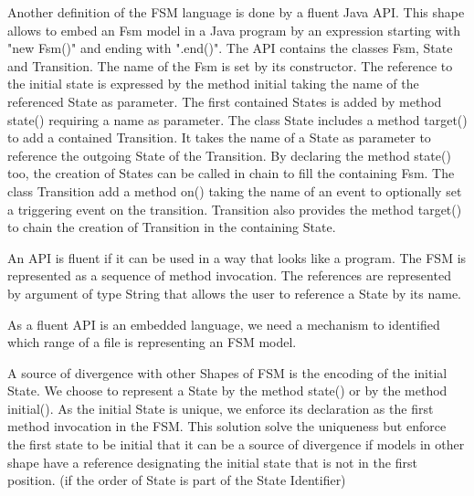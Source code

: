 \documentclass[sigplan]{acmart}
\begin{document}
Another definition of the FSM language is done by a fluent Java API.
This shape allows to embed an Fsm model in a Java program by an expression starting with "new Fsm()" and ending with ".end()".
The API contains the classes Fsm, State and Transition.
The name of the Fsm is set by its constructor.
The reference to the initial state is expressed by the method initial taking the name of the referenced State as parameter.
The first contained States is added by method state() requiring a name as parameter.
The class State includes a method target() to add a contained Transition. It takes the name of a State as parameter to reference the outgoing State of the Transition.
By declaring the method state() too, the creation of States can be called in chain to fill the containing Fsm.
The class Transition add a method on() taking the name of an event to optionally set a triggering event on the transition.
Transition also provides the method target() to chain the creation of Transition in the containing State.

An API is fluent if it can be used in a way that looks like a program.
The FSM is represented as a sequence of method invocation.
The references are represented by argument of type String that allows the user to reference a State by its name.

As a fluent API is an embedded language, we need a mechanism to identified which range of a file is representing an FSM model.

A source of divergence with other Shapes of FSM is the encoding of the initial State.
We choose to represent a State by the method state() or by the method initial().
As the initial State is unique, we enforce its declaration as the first method invocation in the FSM. This solution solve the uniqueness but enforce the first state to be initial that it can be a source of divergence if models in other shape have a reference designating the initial state that is not in the first position. (if the order of State is part of the State Identifier)
\end{document}
